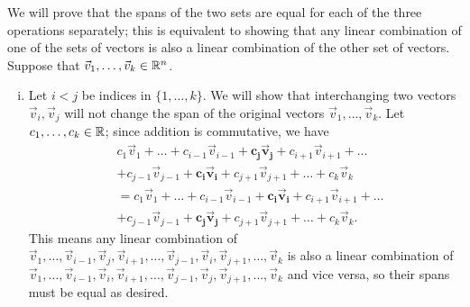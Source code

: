 \documentclass[main.tex]{subfiles}
\begin{document}
\begin{soln}
    We will prove that the spans of the two sets are equal for each of the three operations separately; this is equivalent to showing that any linear combination of one of the sets of vectors is also a linear combination of the other set of vectors. Suppose that $\vec{v}_{1}, \ldots , \vec{v}_{k}\in \mathbb R^n$.
    \begin{enumerate}[(i)]
        \item Let $i < j$ be indices in $\{1, \ldots , k\}$. We will show that interchanging two vectors $\vec{v}_{i}, \vec{v}_{j}$ will not change the span of the original vectors $\vec{v}_{1}, \ldots , \vec{v}_{k}$. Let $c_1, \ldots , c_k \in \mathbb R$; since addition is commutative, we have
        \begin{align*}
            &c_1\vec{v}_{1} + \ldots + c_{i - 1}\vec{v}_{i - 1} + \mathbf{c_j\vec{v}_{j}} + c_{i + 1}\vec{v}_{i + 1} + \ldots \\
            &+ c_{j - 1}\vec{v}_{j - 1} + \mathbf{c_i\vec{v}_{i}} + c_{j + 1}\vec{v}_{j + 1} + \ldots + c_k\vec{v}_{k} \\
            &= c_1\vec{v}_{1} + \ldots + c_{i - 1}\vec{v}_{i - 1} + \mathbf{c_i\vec{v}_{i}} + c_{i + 1}\vec{v}_{i + 1} + \ldots \\
            &+ c_{j - 1}\vec{v}_{j - 1} + \mathbf{c_j\vec{v}_{j}} + c_{j + 1}\vec{v}_{j + 1} + \ldots + c_k\vec{v}_{k}.
        \end{align*}
        This means any linear combination of $\vec{v}_{1}, \ldots , \vec{v}_{i - 1}, \vec{v}_{j}, \vec{v}_{i + 1}, \ldots , \vec{v}_{j - 1}, \vec{v}_{i}, \vec{v}_{j + 1}, \ldots , \vec{v}_{k}$ is also a linear combination of $\vec{v}_{1}, \ldots , \vec{v}_{i - 1}, \vec{v}_{i}, \vec{v}_{i + 1}, \ldots , \vec{v}_{j - 1}, \vec{v}_{j}, \vec{v}_{j + 1}, \ldots ,\vec{v}_{k}$ and vice versa, so their spans must be equal as desired.
        

\end{enumerate}
\end{soln}
\end{document}
